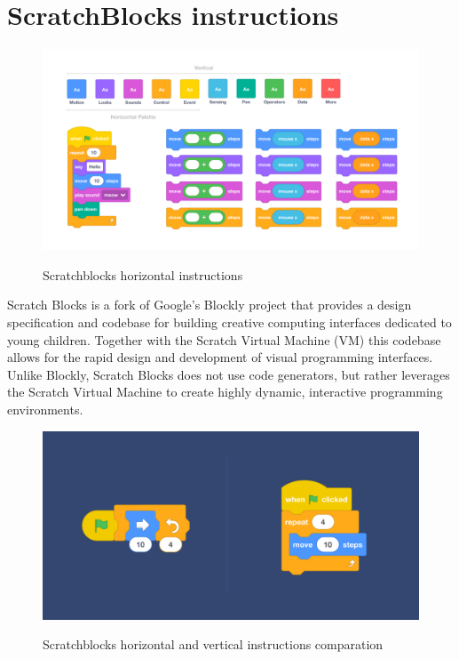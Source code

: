 \documentclass[12 pct]{report}
\begin{document}
\section{ScratchBlocks instructions}
\begin{figure}[H]
\includegraphics[width=1.0\textwidth]{scratchblocks-2}
\centering
\label{fig:hololens}
\caption{Scratchblocks horizontal instructions}
\end{figure}

Scratch Blocks is a fork of Google's Blockly project that provides a design specification and codebase for building creative computing interfaces dedicated to young children. Together with the Scratch Virtual Machine (VM) this codebase allows for the rapid design and development of visual programming interfaces. Unlike Blockly, Scratch Blocks does not use code generators, but rather leverages the Scratch Virtual Machine to create highly dynamic, interactive programming environments.

\begin{figure}[H]
\includegraphics[width=1.0\textwidth]{scratchblocks}
\centering
\label{fig:hololens}
\caption{Scratchblocks horizontal and vertical instructions comparation}
\end{figure}
\end{document}
